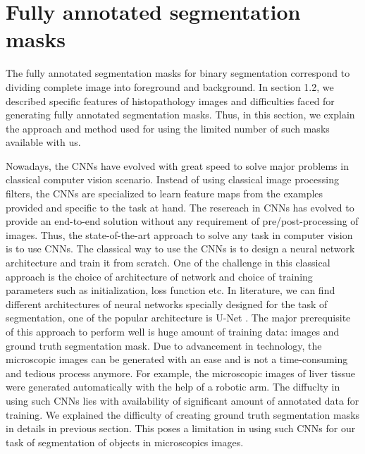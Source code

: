%
\newpage
\chapter{Fully annotated segmentation masks}
The fully annotated segmentation masks for binary segmentation correspond to dividing complete image into foreground and background. In section 1.2, we described specific features of histopathology images and difficulties faced for generating fully annotated segmentation masks. Thus, in this section, we explain the approach and method used for using the limited number of such masks available with us. 



Nowadays, the CNNs have evolved with great speed to solve major problems in classical computer vision scenario. Instead of using classical image processing filters, the CNNs are specialized to learn feature maps from the examples provided and specific to the task at hand. The resereach in CNNs has evolved to provide an end-to-end solution without any requirement of pre/post-processing of images. Thus, the state-of-the-art approach to solve any task in computer vision is to use CNNs. The classical way to use the CNNs is to design a neural network architecture and train it from scratch. One of the challenge in this classical approach is the choice of architecture of network and choice of training parameters such as initialization, loss function etc. In literature, we can find different architectures of neural networks specially designed for the task of segmentation, one of the popular architecture is U-Net \cite{unet}. The major prerequisite of this approach to perform well is huge amount of training data: images and ground truth segmentation mask. Due to advancement in technology, the microscopic images can be generated with an ease and is not a time-consuming and tedious process anymore. For example, the microscopic images of liver tissue were generated automatically with the help of a robotic arm. The diffuclty in using such CNNs lies with availability of significant amount of annotated data for training. We explained the difficulty of creating ground truth segmentation masks in details in previous section. This poses a limitation in using such CNNs for our task of segmentation of objects in microscopics images. 



